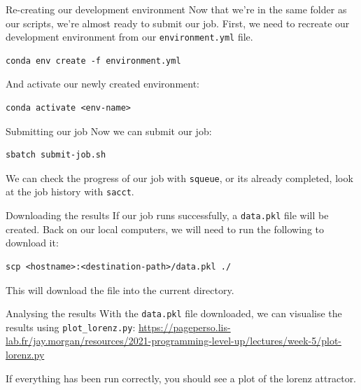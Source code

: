 \documentclass[10pt]{beamer}
\begin{document}
\begin{frame}[label={sec:org7dbba89},fragile]{Re-creating our development environment}
 Now that we're in the same folder as our scripts, we're almost ready to submit
our job. First, we need to recreate our development environment from our
\texttt{environment.yml} file.

\begin{verbatim}
conda env create -f environment.yml
\end{verbatim}

And activate our newly created environment:

\begin{verbatim}
conda activate <env-name>
\end{verbatim}
\end{frame}

\begin{frame}[label={sec:orgff97a6a},fragile]{Submitting our job}
 Now we can submit our job:

\begin{verbatim}
sbatch submit-job.sh
\end{verbatim}

We can check the progress of our job with \texttt{squeue}, or its already completed, look
at the job history with \texttt{sacct}.
\end{frame}

\begin{frame}[label={sec:org5f34f09},fragile]{Downloading the results}
 If our job runs successfully, a \texttt{data.pkl} file will be created. Back on our local
computers, we will need to run the following to download it:

\begin{verbatim}
scp <hostname>:<destination-path>/data.pkl ./
\end{verbatim}

This will download the file into the current directory.
\end{frame}

\begin{frame}[label={sec:org8ea2e01},fragile]{Analysing the results}
 With the \texttt{data.pkl} file downloaded, we can visualise the results using
\texttt{plot\_lorenz.py}:
\url{https://pageperso.lis-lab.fr/jay.morgan/resources/2021-programming-level-up/lectures/week-5/plot-lorenz.py}

If everything has been run correctly, you should see a plot of the lorenz attractor.
\end{frame}
\end{document}
